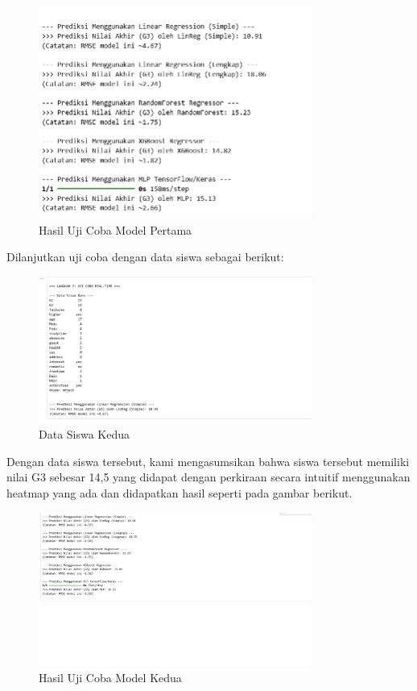 \begin{figure}[h]
    \centering
    \includegraphics[width=0.8\textwidth]{images/hasil2.png}
    \caption{Hasil Uji Coba Model Pertama}
    \label{fig:hasil1}
\end{figure}

Dilanjutkan uji coba dengan data siswa sebagai berikut:

\begin{figure}[h]
    \centering
    \includegraphics[width=0.8\textwidth]{images/datasiswa1.png}
    \caption{Data Siswa Kedua}
    \label{fig:datasiswa2}
\end{figure}

Dengan data siswa tersebut, kami mengasumsikan bahwa siswa tersebut memiliki nilai G3 sebesar 14,5 yang didapat dengan perkiraan secara 
intuitif menggunakan heatmap yang ada dan didapatkan hasil seperti pada gambar berikut.

\begin{figure}[h]
    \centering
    \includegraphics[width=0.8\textwidth]{images/hasil1.png}
    \caption{Hasil Uji Coba Model Kedua}
    \label{fig:hasil2}
\end{figure}

